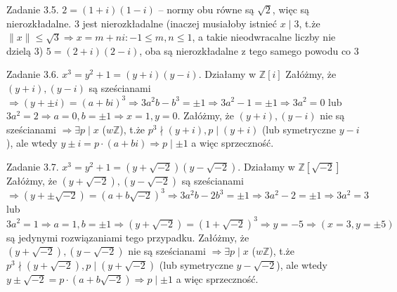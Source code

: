 \documentclass{article}
\begin{document}
Zadanie 3.5.
\newline
\newline
$2=(1+i)(1-i)$ -- normy obu równe są $\sqrt{2}$, więc są nierozkładalne.\newline
$3$ jest nierozkładalne (inaczej musiałoby istnieć $x\mid 3$, t.że $\lVert x\rVert\le\sqrt{3}\Rightarrow x=m+ni:-1\le m,n\le 1$, a takie nieodwracalne liczby nie dzielą 3)\newline
$5=(2+i)(2-i)$, oba są nierozkładalne z tego samego powodu co 3
\newline

Zadanie 3.6.
\newline
\newline
$x^3=y^2+1=(y+i)(y-i)$. Działamy w $\mathbb{Z}[i]$\newline
Załóżmy, że $(y+i),(y-i)$ są sześcianami $\Rightarrow (y+\pm i)=(a+bi)^3\Rightarrow 3a^2b-b^3=\pm 1\Rightarrow 3a^2-1=\pm 1\Rightarrow 3a^2=0$ lub $3a^2=2\Rightarrow a=0,b=\pm1\Rightarrow x=1,y=0$.\newline
Załóżmy, że $(y+i),(y-i)$ nie są sześcianami $\Rightarrow\exists p\mid x$ ($w \mathbb{Z}$), t.że $p^3\nmid (y+i),p\mid (y+i)$ (lub symetryczne $y-i$), ale wtedy $y\pm i=p\cdot(a+bi)\Rightarrow p\mid\pm1$ a więc sprzeczność.
\newline

Zadanie 3.7.
\newline
\newline
$x^3=y^2+1=(y+\sqrt{-2})(y-\sqrt{-2})$. Działamy w $\mathbb{Z}[\sqrt{-2}]$\newline
Załóżmy, że $(y+\sqrt{-2}),(y-\sqrt{-2})$ są sześcianami $\Rightarrow (y+\pm\sqrt{-2})=(a+b\sqrt{-2})^3\Rightarrow 3a^2b-2b^3=\pm 1\Rightarrow 3a^2-2=\pm 1
\Rightarrow 3a^2=3$ lub $3a^2=1\Rightarrow a=1,b=\pm1\Rightarrow (y+\sqrt{-2})=(1+\sqrt{-2})^3\Rightarrow y=-5\Rightarrow (x=3,y=\pm 5)$ są jedynymi rozwiązaniami tego przypadku.\newline
Załóżmy, że $(y+\sqrt{-2}),(y-\sqrt{-2})$ nie są sześcianami $\Rightarrow\exists p\mid x$ ($w \mathbb{Z}$), t.że $p^3\nmid (y+\sqrt{-2}),p\mid (y+\sqrt{-2})$ (lub symetryczne $y-\sqrt{-2}$),
ale wtedy $y\pm \sqrt{-2}=p\cdot(a+b\sqrt{-2})\Rightarrow p\mid\pm1$ a więc sprzeczność.
\end{document}
